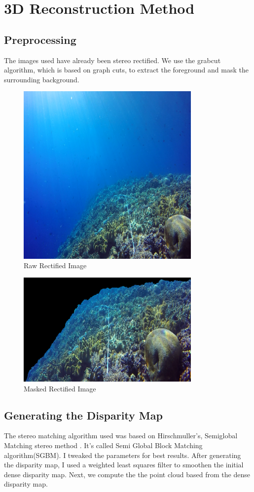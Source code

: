 \chapter{3D Reconstruction Method}

\section{Preprocessing}
	The images used have already been stereo rectified. We use the grabcut algorithm, 
which is based on graph cuts, to extract the foreground and mask the surrounding background.

\begin{figure}[H]
\includegraphics[width=0.8\textwidth, height=0.4\textwidth]{unmasked.eps}
\caption{Raw Rectified Image}
\end{figure}

\begin{figure}[H]
\includegraphics[width=0.8\textwidth, height=0.4\textwidth]{masked-1.eps}
\caption{Masked Rectified Image}
\end{figure}




\section{Generating the Disparity Map}

	The stereo matching algorithm used was based on Hirschmuller's, Semiglobal Matching stereo
method \cite{sgm}. It's called Semi Global Block Matching algorithm(SGBM). I tweaked the parameters for best results. After generating the disparity map, I used a weighted least squares filter to smoothen the initial dense disparity map. Next, we compute the the point cloud based from the dense disparity map.

